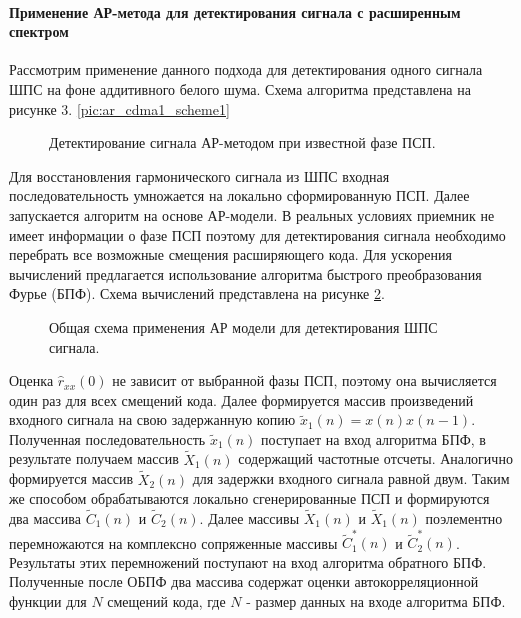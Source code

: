 \paragraph{Применение АР-метода для детектирования сигнала с расширенным спектром}

Рассмотрим применение данного подхода для детектирования одного сигнала ШПС на фоне аддитивного белого шума.
Схема алгоритма представлена на рисунке 3. \ref{pic:ar_cdma1_scheme1}

\begin{figure}[H]
	\center{}
	\caption{Детектирование сигнала АР-методом при известной фазе ПСП.}
	\label{pic:ar_cdma1_scheme2}
\end{figure}

Для восстановления гармонического сигнала из ШПС входная последовательность умножается на локально сформированную ПСП.
Далее запускается алгоритм на основе АР-модели. В реальных условиях приемник не имеет информации о фазе ПСП поэтому для детектирования
сигнала необходимо перебрать все возможные смещения расширяющего кода. Для ускорения вычислений предлагается использование алгоритма быстрого преобразования Фурье (БПФ).
Схема вычислений представлена на рисунке \ref{pic:ar_cdma1_scheme2}.

\begin{figure}[H]
	\center{}
	\caption{Общая схема применения АР модели для детектирования ШПС сигнала.}
	\label{pic:ar_cdma1_scheme2}
\end{figure}

Оценка ${\hat{r}_{xx}(0)}$ не зависит от выбранной фазы ПСП, поэтому она вычисляется один
раз для всех смещений кода. Далее формируется массив произведений входного сигнала на
свою задержанную копию ${\tilde{x}_1(n)=x(n)x(n-1)}$. Полученная последовательность  
${\tilde{x}_1(n)}$ поступает на вход алгоритма БПФ, в результате получаем массив ${\tilde{X}_1(n)}$
содержащий частотные отсчеты. Аналогично формируется массив  ${\tilde{X}_2(n)}$ для
задержки входного сигнала равной двум. Таким же способом обрабатываются локально
сгенерированные ПСП и формируются два массива ${\tilde{C}_1(n)}$ и ${\tilde{C}_2(n)}$.
Далее массивы ${\tilde{X}_1(n)}$ и ${\tilde{X}_1(n)}$ поэлементно перемножаются
на комплексно сопряженные массивы ${\tilde{C}_1^*(n)}$ и ${\tilde{C}_2^*(n)}$.
Результаты этих перемножений поступают на вход алгоритма обратного
БПФ. Полученные после ОБПФ два массива содержат оценки автокорреляционной функции для ${N}$ 
смещений кода, где  ${N}$ - размер данных на входе алгоритма БПФ.

